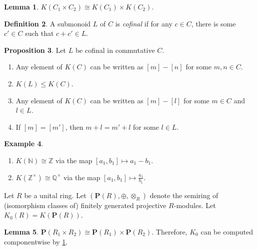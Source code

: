 \documentclass[10pt,letterpaper,cm]{nupset}
\theoremstyle{definition}
\newtheorem{definition}{Definition}[section]
\newtheorem{exmp}[definition]{Example}
\theoremstyle{theorem}
\newtheorem{lemma}[definition]{Lemma}
\newtheorem{prop}[definition]{Proposition}
\theoremstyle{remark}
\newcommand{\N}{\mathbb N}
\renewcommand{\P}{\mathbf P}
\newcommand{\Q}{\mathbb Q}
\newcommand{\Z}{\mathbb Z}
\newcommand{\1}{\mathbf{1}}
\newcommand{\0}{\vec 0}
\begin{document}
\begin{lemma}\label{L2}
$K(C_1 \times C_2) \cong K(C_1) \times K(C_2)$.
\end{lemma}

\begin{definition}
A submonoid $L$ of $C$ is \textit{cofinal} if for any $c\in C$, there is some $c' \in C$ such that $c + c' \in L$.
\end{definition}

\begin{prop}\label{prop2} Let $L$ be cofinal in commutative $C$.
\begin{enumerate}
\item Any element of $K(C)$ can be written as $[m]-[n]$ for some $m, n\in  C$.
\item $K(L) \leq K(C)$.
\item Any element of $K(C)$ can be written as $[m] - [l]$ for some $m\in C$ and $l\in L$.
\item If $[m] = [m']$, then $m + l = m' +l$ for some $l\in L$.
\end{enumerate}
\end{prop}

\begin{exmp}\label{Z} $ $
\begin{enumerate}
\item $K(\N) \cong \Z$ via the map $[a_1, b_1] \mapsto a_1 - b_1$.
\item $K(\Z^{\times}) \cong \Q^{\times}$ via the map $[a_1, b_1] \mapsto \frac{a_1}{b_1}$.
\end{enumerate}
\end{exmp}

\smallskip


Let $R$ be a unital ring. Let $\left(\P(R), \oplus, \otimes_R\right)$ denote the semiring  of (isomorphism classes of) finitely generated projective $R$-modules. Let $K_0(R) = K(\P(R))$.

\begin{lemma}
$\P(R_1 \times R_2) \cong \P(R_1) \times \P(R_2)$. Therefore, $K_0$ can be computed componentwise by \cref{L2}. 
\end{lemma}

\smallskip
\end{document}
